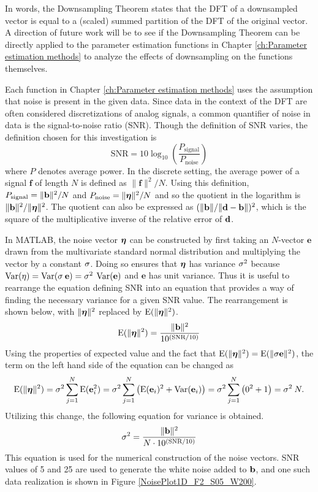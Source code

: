 In words, the Downsampling Theorem states that the DFT of a downsampled vector is equal to a (scaled) summed partition of the DFT of the original vector. A direction of future work will be to see if the Downsampling Theorem can be directly applied to the parameter estimation functions in Chapter \ref{ch:Parameter estimation methods} to analyze the effects of downsampling on the functions themselves. \par 
Each function in Chapter \ref{ch:Parameter estimation methods} uses the assumption that noise is present in the given data. Since data in the context of the DFT are often considered discretizations of analog signals, a common quantifier of noise in data is the signal-to-noise ratio (SNR). Though the definition of SNR varies, the definition chosen for this investigation is
\begin{equation}
\label{eq:SNR}
\text{SNR} = 10\log_{10}\left(\frac{P_{\text{signal}}}{P_{\text{noise}}}\right)
\end{equation}
where $P$ denotes average power. In the discrete setting, the average power of a signal $\mathbf{f}$ of length $N$ is defined as $\|\mathbf{f}\|^2/N$. Using this definition, $P_{\text{signal}} = \|\mathbf{b}\|^2/N$ and $P_{\text{noise}} = \|\bm{\eta}\|^2/N$ and so the quotient in the logarithm is $\|\mathbf{b}\|^2/\|\bm{\eta}\|^2$. The quotient can also be expressed as $(\|\mathbf{b}\|/\|\mathbf{d} - \mathbf{b}\|)^2$, which is the square of the multiplicative inverse of the relative error of $\mathbf{d}$. \par
In MATLAB, the noise vector $\bm{\eta}$ can be constructed by first taking an $N$-vector $\mathbf{e}$ drawn from the multivariate standard normal distribution and multiplying the vector by a constant $\sigma$. Doing so ensures that $\bm{\eta}$ has variance $\sigma^2$ because $\operatorname{Var}(\eta) = \operatorname{Var}(\sigma\:\mathbf{e}) = \sigma^2\:\operatorname{Var}(\mathbf{e})$ and $\mathbf{e}$ has unit variance. Thus it is useful to rearrange the equation defining SNR into an equation that provides a way of finding the necessary variance for a given SNR value. The rearrangement is shown below, with $\|\bm{\eta}\|^2$ replaced by $\operatorname{E}(\|\bm{\eta}\|^2)$.
\[\operatorname{E}(\|\bm{\eta}\|^2) = \frac{\|\mathbf{b}\|^2}{10^{(\text{SNR}/10)}}\]
Using the properties of expected value and the fact that $\operatorname{E}(\|\bm{\eta}\|^2) = \operatorname{E}(\|\sigma \mathbf{e}\|^2)$, the term on the left hand side of the equation can be changed as
\[\operatorname{E}(\|\bm{\eta}\|^2) = \sigma^2 \sum_{j=1}^N \operatorname{E}(\mathbf{e}_i^2) = \sigma^2 \sum_{j=1}^N \left(\operatorname{E}(\mathbf{e}_i)^2 + \operatorname{Var}(\mathbf{e}_i)\right) = \sigma^2 \sum_{j=1}^N \left(0^2 + 1\right) = \sigma^2\:N.\]
Utilizing this change, the following equation for variance is obtained.
\begin{equation}
\label{eq:Var}
\sigma^2 = \frac{\|\mathbf{b}\|^2}{N \cdot 10^{(\text{SNR}/10)}}
\end{equation}
This equation is used for the numerical construction of the noise vectors. SNR values of 5 and 25 are used to generate the white noise added to $\mathbf{b}$, and one such data realization is shown in Figure \ref{NoisePlot1D_F2_S05_W200}. \par


